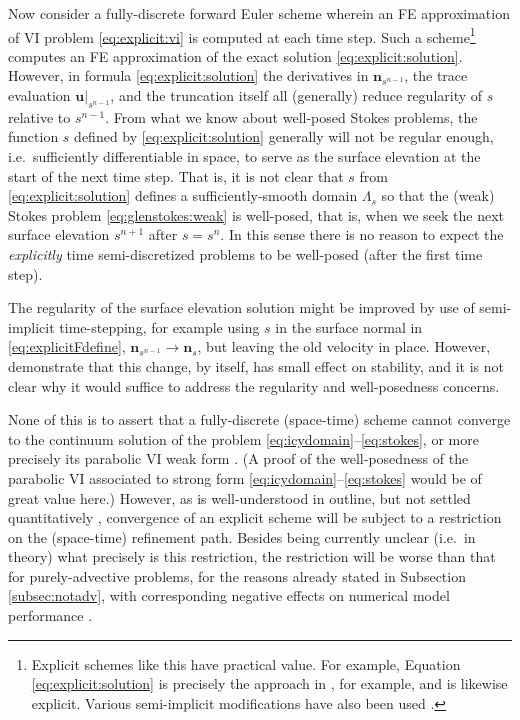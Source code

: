 \documentclass[hidelinks,onefignum,onetabnum,final]{siamart220329}  %
\newcommand{\bn}{\mathbf{n}}
\newcommand{\bu}{\mathbf{u}}
\begin{document}
Now consider a fully-discrete forward Euler scheme wherein an FE approximation of VI problem \eqref{eq:explicit:vi} is computed at each time step.  Such a scheme\footnote{Explicit schemes like this have practical value.  For example, Equation \eqref{eq:explicit:solution} is precisely the approach in \cite{Lengetal2012}, for example, and \cite{Jouvetetal2008} is likewise explicit.  Various semi-implicit modifications have also been used \cite{Chengetal2020,Durandetal2009,LofgrenAhlkronaHelanow2022,WirbelJarosch2020}.} computes an FE approximation of the exact solution \eqref{eq:explicit:solution}.  However, in formula \eqref{eq:explicit:solution} the derivatives in $\bn_{s^{n-1}}$, the trace evaluation $\bu|_{s^{n-1}}$, and the truncation itself all (generally) reduce regularity of $s$  relative to $s^{n-1}$.  From what we know about well-posed Stokes problems, the function $s$ defined by \eqref{eq:explicit:solution} generally will not be regular enough, i.e.~sufficiently differentiable in space, to serve as the surface elevation at the start of the next time step.  That is, it is not clear that $s$ from \eqref{eq:explicit:solution} defines a sufficiently-smooth domain $\Lambda_s$ so that the (weak) Stokes problem \eqref{eq:glenstokes:weak} is well-posed, that is, when we seek the next surface elevation $s^{n+1}$ after $s=s^n$.  In this sense there is no reason to expect the \emph{explicitly} time semi-discretized problems to be well-posed (after the first time step).

The regularity of the surface elevation solution might be improved by use of semi-implicit time-stepping, for example using $s$ in the surface normal in \eqref{eq:explicitFdefine}, $\bn_{s^{n-1}} \to \bn_s$, but leaving the old velocity in place.  However, \cite{LofgrenAhlkronaHelanow2022} demonstrate that this change, by itself, has small effect on stability, and it is not clear why it would suffice to address the regularity and well-posedness concerns.

None of this is to assert that a fully-discrete (space-time) scheme cannot converge to the continuum solution of the problem \eqref{eq:icydomain}--\eqref{eq:stokes}, or more precisely its
parabolic VI weak form \cite{Glowinski1984}.  (A proof of the well-posedness of the parabolic VI associated to strong form \eqref{eq:icydomain}--\eqref{eq:stokes} would be of great value here.)  However, as is well-understood in outline, but not settled quantitatively \cite{Chengetal2017}, convergence of an explicit scheme will be subject to a restriction on the (space-time) refinement path.  Besides being currently unclear (i.e.~in theory) what precisely is this restriction, the restriction will be worse than that for purely-advective problems, for the reasons already stated in Subsection \ref{subsec:notadv}, with corresponding negative effects on numerical model performance \cite{Bueler2023}.
\end{document}
